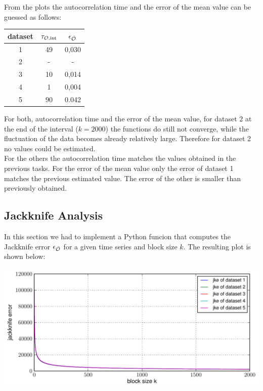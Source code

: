 \documentclass[12pt,a4paper]{scrartcl}
\begin{document}
From the plots the autocorrelation time and the error of the mean value can be guessed as follows:

\begin{center}

\begin{tabular}{|c|c|c|}
\hline 
dataset & $\tau_{\cal{O},\text{int}}$ & $\epsilon_{\bar{\cal O} {}}$ \\ 
\hline 
1 & 49 & 0,030 \\ 
\hline 
2 & - & - \\ 
\hline 
3 & 10 & 0,014 \\ 
\hline 
4 & 1 & 0,004 \\ 
\hline 
5 & 90 & 0.042 \\ 
\hline 
\end{tabular} 

\end{center}

For both, autocorrelation time and the error of the mean value, for dataset 2 at the end of the interval ($k=2000$) the functions do still not converge, while the fluctuation of the data becomes already relatively large. Therefore for dataset 2 no values could be estimated.\\
For the others the autocorrelation time matches the values obtained in the previous tasks. For the error of the mean value only the error of dataset 1 matches the previous estimated value. The error of the other is smaller than previously obtained.

\subsection{Jackknife Analysis}
In this section we had to implement a Python funcion that computes the Jackknife error $\epsilon_{\bar{\cal O} {}}$ for a given time series and block size $k$. The resulting plot is shown below:

\begin{minipage}[hbt]{15cm}
	\centering
	\includegraphics[width=16cm]{../plots/jackk.pdf}
\end{minipage}
\end{document}
